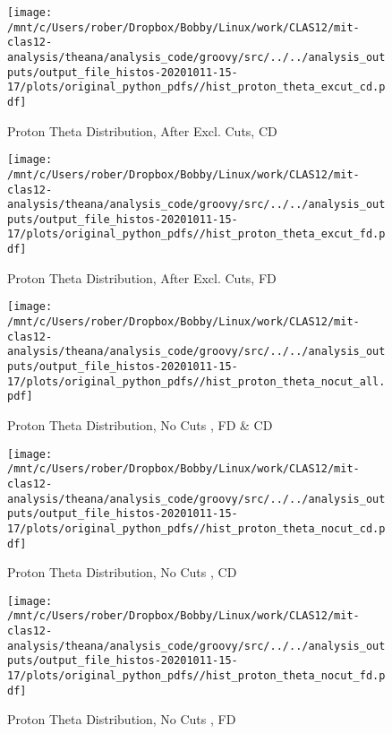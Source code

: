 \documentclass{article}
\begin{document}
\begin{landscape}
    \begin{figure}[h]
        \centering

        \texttt{[image: /mnt/c/Users/rober/Dropbox/Bobby/Linux/work/CLAS12/mit-clas12-analysis/theana/analysis\_code/groovy/src/../../analysis\_outputs/output\_file\_histos-20201011-15-17/plots/original\_python\_pdfs//hist\_proton\_theta\_excut\_cd.pdf]}
        \captionsetup{textformat=empty,labelformat=blank}
        \caption{Proton Theta Distribution, After Excl. Cuts, CD}
    \end{figure}
    \clearpage
    
    \begin{figure}[h]
        \centering

        \texttt{[image: /mnt/c/Users/rober/Dropbox/Bobby/Linux/work/CLAS12/mit-clas12-analysis/theana/analysis\_code/groovy/src/../../analysis\_outputs/output\_file\_histos-20201011-15-17/plots/original\_python\_pdfs//hist\_proton\_theta\_excut\_fd.pdf]}
        \captionsetup{textformat=empty,labelformat=blank}
        \caption{Proton Theta Distribution, After Excl. Cuts, FD}
    \end{figure}
    \clearpage
    
    \begin{figure}[h]
        \centering

        \texttt{[image: /mnt/c/Users/rober/Dropbox/Bobby/Linux/work/CLAS12/mit-clas12-analysis/theana/analysis\_code/groovy/src/../../analysis\_outputs/output\_file\_histos-20201011-15-17/plots/original\_python\_pdfs//hist\_proton\_theta\_nocut\_all.pdf]}
        \captionsetup{textformat=empty,labelformat=blank}
        \caption{Proton Theta Distribution, No Cuts , FD \& CD}
    \end{figure}
    \clearpage
    
    \begin{figure}[h]
        \centering

        \texttt{[image: /mnt/c/Users/rober/Dropbox/Bobby/Linux/work/CLAS12/mit-clas12-analysis/theana/analysis\_code/groovy/src/../../analysis\_outputs/output\_file\_histos-20201011-15-17/plots/original\_python\_pdfs//hist\_proton\_theta\_nocut\_cd.pdf]}
        \captionsetup{textformat=empty,labelformat=blank}
        \caption{Proton Theta Distribution, No Cuts , CD}
    \end{figure}
    \clearpage
    
    \begin{figure}[h]
        \centering

        \texttt{[image: /mnt/c/Users/rober/Dropbox/Bobby/Linux/work/CLAS12/mit-clas12-analysis/theana/analysis\_code/groovy/src/../../analysis\_outputs/output\_file\_histos-20201011-15-17/plots/original\_python\_pdfs//hist\_proton\_theta\_nocut\_fd.pdf]}
        \captionsetup{textformat=empty,labelformat=blank}
        \caption{Proton Theta Distribution, No Cuts , FD}
    \end{figure}
    \clearpage
    

\end{landscape}
\end{document}
